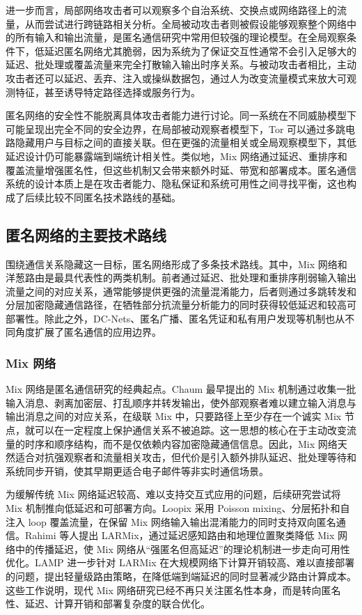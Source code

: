 进一步而言，局部网络攻击者可以观察多个自治系统、交换点或网络路径上的流量，从而尝试进行跨链路相关分析。全局被动攻击者则被假设能够观察整个网络中的所有输入和输出流量，是匿名通信研究中常用但较强的理论模型。在全局观察条件下，低延迟匿名网络尤其脆弱，因为系统为了保证交互性通常不会引入足够大的延迟、批处理或覆盖流量来完全打散输入输出时序关系。与被动攻击者相比，主动攻击者还可以延迟、丢弃、注入或操纵数据包，通过人为改变流量模式来放大可观测特征，甚至诱导特定路径选择或服务行为。

匿名网络的安全性不能脱离具体攻击者能力进行讨论。同一系统在不同威胁模型下可能呈现出完全不同的安全边界，在局部被动观察者模型下，Tor 可以通过多跳电路隐藏用户与目标之间的直接关联。但在更强的流量相关或全局观察模型下，其低延迟设计仍可能暴露端到端统计相关性。类似地，Mix 网络通过延迟、重排序和覆盖流量增强匿名性，但这些机制又会带来额外时延、带宽和部署成本。匿名通信系统的设计本质上是在攻击者能力、隐私保证和系统可用性之间寻找平衡，这也构成了后续比较不同匿名技术路线的基础。

\subsection{匿名网络的主要技术路线}

围绕通信关系隐藏这一目标，匿名网络形成了多条技术路线。其中，Mix 网络和洋葱路由是最具代表性的两类机制。前者通过延迟、批处理和重排序削弱输入输出流量之间的对应关系，通常能够提供更强的流量混淆能力，后者则通过多跳转发和分层加密隐藏通信路径，在牺牲部分抗流量分析能力的同时获得较低延迟和较高可部署性。除此之外，DC-Nets、匿名广播、匿名凭证和私有用户发现等机制也从不同角度扩展了匿名通信的应用边界。

\subsubsection{Mix 网络}
Mix 网络是匿名通信研究的经典起点。Chaum 最早提出的 Mix 机制通过收集一批输入消息、剥离加密层、打乱顺序并转发输出，使外部观察者难以建立输入消息与输出消息之间的对应关系，在级联 Mix 中，只要路径上至少存在一个诚实 Mix 节点，就可以在一定程度上保护通信关系不被追踪\cite{chaum1981untraceable}。这一思想的核心在于主动改变流量的时序和顺序结构，而不是仅依赖内容加密隐藏通信信息。因此，Mix 网络天然适合对抗强观察者和流量相关攻击，但代价是引入额外排队延迟、批处理等待和系统同步开销，使其早期更适合电子邮件等非实时通信场景。

为缓解传统 Mix 网络延迟较高、难以支持交互式应用的问题，后续研究尝试将 Mix 机制推向低延迟和可部署方向。Loopix 采用 Poisson mixing、分层拓扑和自注入 loop 覆盖流量，在保留 Mix 网络输入输出混淆能力的同时支持双向匿名通信\cite{piotrowska2017loopix}。Rahimi 等人提出 LARMix，通过延迟感知路由和地理位置聚类降低 Mix 网络中的传播延迟，使 Mix 网络从“强匿名但高延迟”的理论机制进一步走向可用性优化\cite{rahimi2024larmix}。LAMP 进一步针对 LARMix 在大规模网络下计算开销较高、难以直接部署的问题，提出轻量级路由策略，在降低端到端延迟的同时显著减少路由计算成本\cite{rahimi2025lamp}。这些工作说明，现代 Mix 网络研究已经不再只关注匿名性本身，而是转向匿名性、延迟、计算开销和部署复杂度的联合优化。

